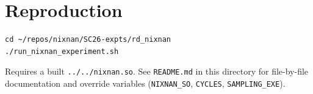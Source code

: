 \documentclass[11pt,a4paper]{article}
\begin{document}
\section*{Reproduction}

\begin{lstlisting}
cd ~/repos/nixnan/SC26-expts/rd_nixnan
./run_nixnan_experiment.sh
\end{lstlisting}

\noindent Requires a built \texttt{../../nixnan.so}. See \texttt{README.md}
in this directory for file-by-file documentation and override variables
(\texttt{NIXNAN\_SO}, \texttt{CYCLES}, \texttt{SAMPLING\_EXE}).
\end{document}
